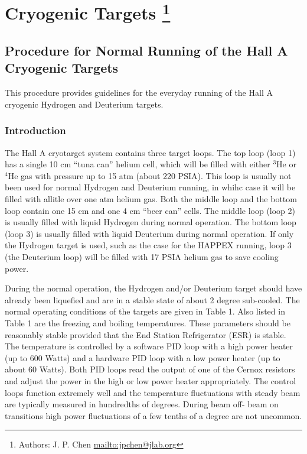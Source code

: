 \chapter[Cryogenic Targets]{Cryogenic Targets
\footnote{Authors: J. P. Chen \url{mailto:jpchen@jlab.org}}
}

\section{Procedure for Normal Running of the Hall A Cryogenic Targets}
This procedure provides guidelines for the everyday running of the Hall A
cryogenic Hydrogen and Deuterium targets.

\subsection{Introduction }
The Hall A cryotarget system contains three target loops. The top loop (loop 1)
has a single 10 cm ``tuna can'' helium cell, which will be filled with either 
$^3$He or $^4$He gas with pressure up to 15 atm (about 220 PSIA). This loop 
is usually not been used for normal Hydrogen and Deuterium running, in whihc 
case it will be filled with allitle over one atm helium gas. Both the middle 
loop and the bottom loop contain one 15 cm and one 4 cm  ``beer can'' cells.
The middle loop (loop 2) is usually filled with liquid Hydrogen during normal 
operation.
The bottom loop (loop 3) is usually filled with liquid Deuterium during normal
operation. If only the Hydrogen target is used, such as the case for   
the HAPPEX running, loop 3 (the Deuterium loop) 
will be filled with 17 PSIA helium gas to save cooling power.

\par
During the normal operation, the Hydrogen and/or Deuterium target should
have already been liquefied and are in a stable state of 
about 2 degree sub-cooled. 
The normal operating conditions of the targets are given in Table 1.
Also listed in Table 1 are the freezing and boiling temperatures.
These parameters should be reasonably stable provided that the End Station
Refrigerator (ESR) is stable. The
temperature is controlled by a software PID loop with a high power heater (up
to 600 Watts) and a hardware PID loop with a low power heater (up to about 
60 Watts). Both PID loops read the output of one
of the Cernox resistors and adjust the power in the high or low power heater 
appropriately.
The control loops function extremely well and the temperature fluctuations with
steady beam are typically measured in hundredths of degrees. During beam off-
beam on transitions high power fluctuations of a few tenths of a degree are
not uncommon.

